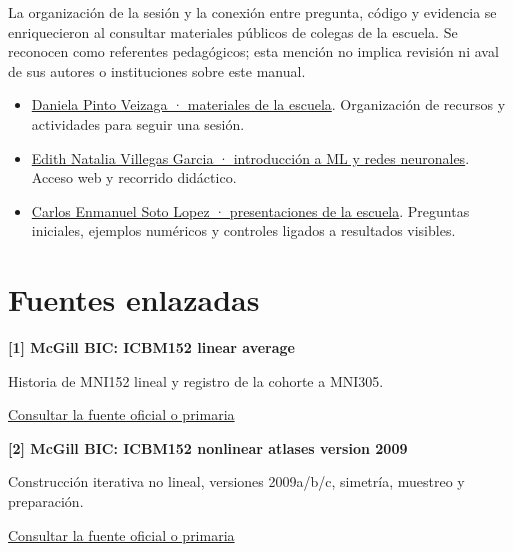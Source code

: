 La organización de la sesión y la conexión entre pregunta, código y evidencia se enriquecieron al consultar materiales públicos de colegas de la escuela. Se reconocen como referentes pedagógicos; esta mención no implica revisión ni aval de sus autores o instituciones sobre este manual.


\begin{itemize}\item \href{https://dapivei.github.io/escuela-machine-learning-honduras-2026/}{Daniela Pinto Veizaga · materiales de la escuela}. Organización de recursos y actividades para seguir una sesión.\item \href{https://edithvillegas.github.io/introduccion-ml-redes-neuronales/}{Edith Natalia Villegas Garcia · introducción a ML y redes neuronales}. Acceso web y recorrido didáctico.\item \href{https://carlossoto362.github.io/pwf_honduras_slides/main.html}{Carlos Enmanuel Soto Lopez · presentaciones de la escuela}. Preguntas iniciales, ejemplos numéricos y controles ligados a resultados visibles.\end{itemize}


\section{Fuentes enlazadas}

\hypertarget{refR1}{}\textbf{[1] McGill BIC: ICBM152 linear average}\par

Historia de MNI152 lineal y registro de la cohorte a MNI305.


\href{https://www.bic.mni.mcgill.ca/ServicesAtlases/ICBM152Lin}{Consultar la fuente oficial o primaria}\par\medskip

\hypertarget{refR2}{}\textbf{[2] McGill BIC: ICBM152 nonlinear atlases version 2009}\par

Construcción iterativa no lineal, versiones 2009a/b/c, simetría, muestreo y preparación.


\href{https://www.bic.mni.mcgill.ca/ServicesAtlases/ICBM152NLin2009}{Consultar la fuente oficial o primaria}\par\medskip

